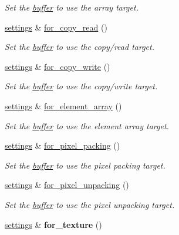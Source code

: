 \begin{DoxyCompactItemize}
\begin{DoxyCompactList}\small\item\em Set the \hyperlink{classgfx_1_1buffer}{buffer} to use the array target. \end{DoxyCompactList}\item 
\hyperlink{classgfx_1_1buffer_1_1settings}{settings} \& \hyperlink{classgfx_1_1buffer_1_1settings_ab9bc0764e0479c2b9460787dd5a57297}{for\-\_\-copy\-\_\-read} ()
\begin{DoxyCompactList}\small\item\em Set the \hyperlink{classgfx_1_1buffer}{buffer} to use the copy/read target. \end{DoxyCompactList}\item 
\hyperlink{classgfx_1_1buffer_1_1settings}{settings} \& \hyperlink{classgfx_1_1buffer_1_1settings_a6b9f1424cac1fc7b7c3381391c19efac}{for\-\_\-copy\-\_\-write} ()
\begin{DoxyCompactList}\small\item\em Set the \hyperlink{classgfx_1_1buffer}{buffer} to use the copy/write target. \end{DoxyCompactList}\item 
\hyperlink{classgfx_1_1buffer_1_1settings}{settings} \& \hyperlink{classgfx_1_1buffer_1_1settings_a2a51b6935928ccaad179311d6c3e18a1}{for\-\_\-element\-\_\-array} ()
\begin{DoxyCompactList}\small\item\em Set the \hyperlink{classgfx_1_1buffer}{buffer} to use the element array target. \end{DoxyCompactList}\item 
\hyperlink{classgfx_1_1buffer_1_1settings}{settings} \& \hyperlink{classgfx_1_1buffer_1_1settings_aa88037a78048160da28331f892cc1a8a}{for\-\_\-pixel\-\_\-packing} ()
\begin{DoxyCompactList}\small\item\em Set the \hyperlink{classgfx_1_1buffer}{buffer} to use the pixel packing target. \end{DoxyCompactList}\item 
\hyperlink{classgfx_1_1buffer_1_1settings}{settings} \& \hyperlink{classgfx_1_1buffer_1_1settings_a16212db2de876244671f4220611b961a}{for\-\_\-pixel\-\_\-unpacking} ()
\begin{DoxyCompactList}\small\item\em Set the \hyperlink{classgfx_1_1buffer}{buffer} to use the pixel unpacking target. \end{DoxyCompactList}\item 
\hypertarget{classgfx_1_1buffer_1_1settings_a49c6f7ee597ff0b972cf1193142aabb5}{\hyperlink{classgfx_1_1buffer_1_1settings}{settings} \& {\bfseries for\-\_\-texture} ()}\label{classgfx_1_1buffer_1_1settings_a49c6f7ee597ff0b972cf1193142aabb5}


\end{DoxyCompactItemize}
